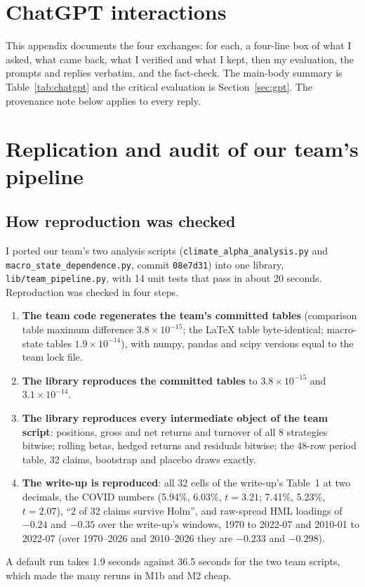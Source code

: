 \clearpage
\appendix
{}
\renewcommand{\runningtitle}{Read the Label: Appendices}

\section{ChatGPT interactions}
\label{app:chatgpt}

This appendix documents the four exchanges: for each, a four-line box of what I asked, what came back, what I verified and what I kept, then my evaluation, the prompts and replies verbatim, and the fact-check. The main-body summary is Table~\ref{tab:chatgpt} and the critical evaluation is Section~\ref{sec:gpt}. The provenance note below applies to every reply.



\clearpage
\section{Replication and audit of our team's pipeline}
\label{app:replication}

\subsection{How reproduction was checked}
I ported our team's two analysis scripts (\texttt{climate\_alpha\_\allowbreak analysis.py} and \texttt{macro\_state\_\allowbreak dependence.py}, commit \texttt{08e7d31}) into one library, \texttt{lib/\allowbreak team\_pipeline.py}, with 14 unit tests that pass in about 20 seconds. Reproduction was checked in four steps.
\begin{enumerate}
\item \textbf{The team code regenerates the team's committed tables} (comparison table maximum difference $3.8\times10^{-15}$; the \LaTeX{} table byte-identical; macro-state tables $1.9\times10^{-14}$), with numpy, pandas and scipy versions equal to the team lock file.
\item \textbf{The library reproduces the committed tables} to $3.8\times10^{-15}$ and $3.1\times10^{-14}$.
\item \textbf{The library reproduces every intermediate object of the team script}: positions, gross and net returns and turnover of all 8 strategies bitwise; rolling betas, hedged returns and residuals bitwise; the 48-row period table, 32 claims, bootstrap and placebo draws exactly.
\item \textbf{The write-up is reproduced}: all 32 cells of the write-up's Table~1 at two decimals, the COVID numbers (5.94\%, 6.03\%, $t=3.21$; 7.41\%, 5.23\%, $t=2.07$), ``2 of 32 claims survive Holm'', and raw-spread HML loadings of $-0.24$ and $-0.35$ over the write-up's windows, 1970 to 2022-07 and 2010-01 to 2022-07 (over 1970--2026 and 2010--2026 they are $-0.233$ and $-0.298$).
\end{enumerate}
A default run takes 1.9 seconds against 36.5 seconds for the two team scripts, which made the many reruns in M1b and M2 cheap.

